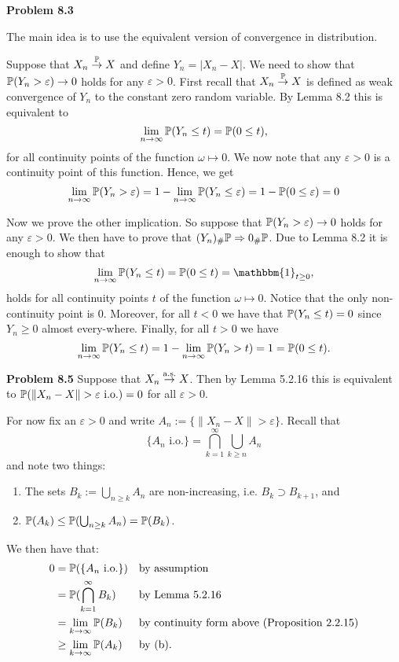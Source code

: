 \documentclass{lecturenotes}
\begin{document}
\textbf{Problem 8.3}

The main idea is to use the equivalent version of convergence in distribution.

Suppose that $X_n \stackrel{\mathbb P}{\rightarrow} X$ and define $Y_n = |X_n - X|$. We need to show that $\mathbb P(Y_n > \varepsilon) \to 0$ holds for any $\varepsilon > 0$. First recall that $X_n \stackrel{\mathbb P}{\rightarrow} X$ is defined as weak convergence of $Y_n$ to the constant zero random variable. By Lemma 8.2 this is equivalent to 
\[
	\lim_{n \to \infty} \mathbb P(Y_n \le t) = \mathbb P(0 \le t),
\]
for all continuity points of the function $\omega \mapsto 0$. We now note that any $\varepsilon > 0$ is a continuity point of this function. Hence, we get
\[
	\lim_{n \to \infty} \mathbb P(Y_n > \varepsilon) = 1 - \lim_{n \to \infty} \mathbb P(Y_n \le \varepsilon) = 1 - \mathbb P(0 \le \varepsilon) = 0
\]

Now we prove the other implication. So suppose that $\mathbb P(Y_n > \varepsilon) \to 0$ holds for any $\varepsilon > 0$. We then have to prove that $(Y_n)_\# \mathbb P \Rightarrow 0_\# \mathbb P$. Due to Lemma 8.2 it is enough to show that
\[
	\lim_{n \to \infty} \bbP(Y_n \le t) = \bbP(0 \le t) = \mathbbm{1}_{t \ge 0},
\]
holds for all continuity points $t$ of the function $\omega \mapsto 0$. Notice that the only non-continuity point is $0$. Moreover, for all $t < 0$ we have that $\mathbb P(Y_n \le t) = 0$ since $Y_n \ge 0$ almost every-where. Finally, for all $t > 0$ we have
\[
	\lim_{n \to \infty} \mathbb P(Y_n \le t) = 1 - \lim_{n \to \infty} \mathbb P(Y_n > t) = 1 = \mathbb P(0 \le t). 
\]

\bigskip

\textbf{Problem 8.5}
Suppose that $X_n \stackrel{\mathrm{a.s.}}{\rightarrow} X$. Then by Lemma 5.2.16 this is equivalent to $\mathbb P(\|X_n - X\| > \varepsilon \text{ i.o.}) = 0$ for all $\varepsilon > 0$. 

For now fix an $\varepsilon > 0$ and write $A_n := \{\|X_n - X\| > \varepsilon\}$. Recall that
\[
	\{A_n \text{ i.o.}\} = \bigcap_{k = 1}^\infty \bigcup_{k \ge n} A_n
\]
and note two things:
\begin{enumerate}[label={(\alph*)}]
\item The sets $B_k := \bigcup_{n \ge k} A_n$ are non-increasing, i.e. $B_k \supset B_{k+1}$, and
\item $\mathbb P(A_k) \le \mathbb P(\bigcup_{n \ge k} A_n) = \mathbb P(B_k)$.
\end{enumerate}
 
We then have that:
\begin{align*}
	0 &= \mathbb P(\{A_n \text{ i.o.}\}) &&\text{by assumption} \\
	&= \mathbb P(\bigcap_{k =1}^\infty B_k) &&\text{by Lemma 5.2.16}\\
	&= \lim_{k \to \infty} \mathbb P(B_k) &&\text{by continuity form above (Proposition 2.2.15)}\\
	&\ge \lim_{k \to \infty} \mathbb P(A_k) &&\text{by (b)}.
\end{align*}
\end{document}
